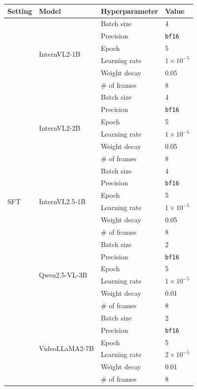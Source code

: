 \documentclass{article}
\begin{document}
\begin{table}[h]
\centering
\begin{tabular}{llll}
\toprule
\textbf{Setting} & \textbf{Model} & \textbf{Hyperparameter} & \textbf{Value} \\
\midrule

\multirow{30}{*}{SFT}
& \multirow{6}{*}{InternVL2-1B}
& Batch size & 4 \\
& & Precision & \texttt{bf16} \\
& & Epoch & 5 \\
& & Learning rate & $1\times10^{-5}$ \\
& & Weight decay & 0.05 \\
& & \# of frames & 8 \\ 
\cmidrule(lr){2-4}

& \multirow{6}{*}{InternVL2-2B}
& Batch size & 4 \\
& & Precision & \texttt{bf16} \\
& & Epoch & 5 \\
& & Learning rate & $1\times10^{-5}$ \\
& & Weight decay & 0.05 \\
& & \# of frames & 8 \\ 
\cmidrule(lr){2-4}

& \multirow{6}{*}{InternVL2.5-1B}
& Batch size & 4 \\
& & Precision & \texttt{bf16} \\
& & Epoch & 5 \\
& & Learning rate & $1\times10^{-5}$ \\
& & Weight decay & 0.05 \\
& & \# of frames & 8 \\ 
\cmidrule(lr){2-4}

& \multirow{6}{*}{Qwen2.5-VL-3B}
& Batch size & 2 \\
& & Precision & \texttt{bf16} \\
& & Epoch & 5 \\
& & Learning rate & $1\times10^{-5}$ \\
& & Weight decay & 0.01 \\
& & \# of frames & 8 \\ 
\cmidrule(lr){2-4}

& \multirow{6}{*}{VideoLLaMA2-7B}
& Batch size & 2 \\
& & Precision & \texttt{bf16} \\
& & Epoch & 5 \\
& & Learning rate & $2\times10^{-5}$ \\
& & Weight decay & 0.01 \\
& & \# of frames & 8 \\ 


\end{tabular}
\end{table}
\end{document}

